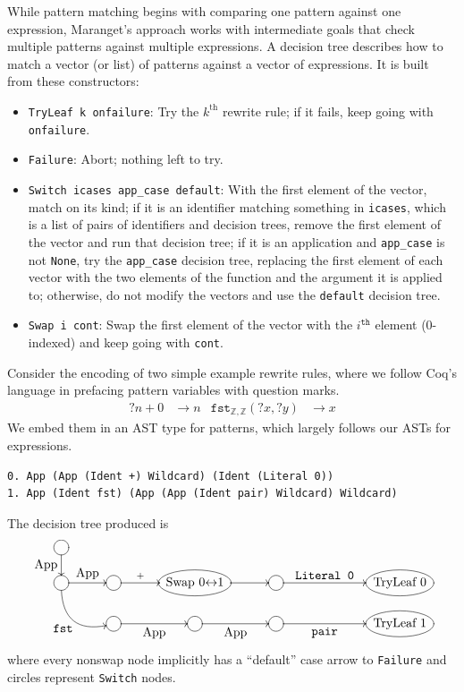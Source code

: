 While pattern matching begins with comparing one pattern against one expression, Maranget's approach works with intermediate goals that check multiple patterns against multiple expressions.
A decision tree describes how to match a vector (or list) of patterns against a vector of expressions.
It is built from these constructors:
\begin{itemize}
  \item \texttt{TryLeaf k onfailure}: Try the $k^\text{th}$ rewrite rule; if it fails, keep going with \texttt{onfailure}.
  \item \texttt{Failure}: Abort; nothing left to try.
  \item \texttt{Switch icases app\_case default}:
    With the first element of the vector, match on its kind; if it is an identifier matching something in \texttt{icases}, which is a list of pairs of identifiers and decision trees, remove the first element of the vector and run that decision tree; if it is an application and \texttt{app\_case} is not \texttt{None}, try the \texttt{app\_case} decision tree, replacing the first element of each vector with the two elements of the function and the argument it is applied to; otherwise, do not modify the vectors and use the \texttt{default} decision tree.
  \item \texttt{Swap i cont}: Swap the first element of the vector with the $i^\texttt{th}$ element (0-indexed) and keep going with \texttt{cont}.
\end{itemize}

Consider the encoding of two simple example rewrite rules, where we follow Coq's \Ltac{} language in prefacing pattern variables with question marks.
\begin{align*}
  ?n + 0 & \to n %
  &
  \texttt{fst}_{\mathbb{Z},\mathbb{Z}}(?x, ?y) & \to x
\end{align*}
We embed them in an AST type for patterns, which largely follows our ASTs for expressions.
\begin{verbatim}
0. App (App (Ident +) Wildcard) (Ident (Literal 0))
1. App (Ident fst) (App (App (Ident pair) Wildcard) Wildcard)
\end{verbatim}
The decision tree produced is \label{sec:compiled-pattern}
\[\xymatrix@C+0.5pc@R-1pc{
  *++[o][F-]\txt{} \ar[d]_{\txt{App}} \\
  *++[o][F-]\txt{} \ar[r]^-{\txt{App}} \ar@/_1.5pc/[dr]_{\txt{\texttt{fst}}} & *++[o][F-]\txt{} \ar[r]^-{+} & *++[o][F-]\txt{Swap 0$\leftrightarrow$1} \ar[r] & *++[o][F-]\txt{} \ar[rr]^-{\txt{\texttt{Literal~0}}} && *++[o][F-]\txt{TryLeaf 0} \\
  & *++[o][F-]\txt{} \ar[r]_-{\txt{App}} & *++[o][F-]\txt{} \ar[r]_-{\txt{App}} & *++[o][F-]\txt{} \ar[rr]_-{\txt{\texttt{pair}}} && *++[o][F-]\txt{TryLeaf 1}
}\]
\noindent where every nonswap node implicitly has a ``default'' case arrow to \texttt{Failure} and circles represent \texttt{Switch} nodes.

